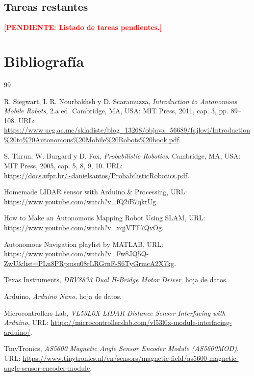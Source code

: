 \documentclass[12pt,a4paper]{article}
\newcommand{\pendiente}[1]{\textcolor{red}{\textbf{[PENDIENTE: #1]}}}
\begin{document}
\subsection{Tareas restantes}
\pendiente{Listado de tareas pendientes.}

\section{Bibliografía}

\begin{thebibliography}{99}

R. Siegwart, I. R. Nourbakhsh y D. Scaramuzza,
\textit{Introduction to Autonomous Mobile Robots}, 2.a ed.
Cambridge, MA, USA: MIT Press, 2011, cap. 3, pp. 89--108.
URL: \url{https://www.ucg.ac.me/skladiste/blog_13268/objava_56689/fajlovi/Introduction%20to%20Autonomous%20Mobile%20Robots%20book.pdf}.

S. Thrun, W. Burgard y D. Fox,
\textit{Probabilistic Robotics}.
Cambridge, MA, USA: MIT Press, 2005, cap. 5, 8, 9, 10.
URL: \url{https://docs.ufpr.br/~danielsantos/ProbabilisticRobotics.pdf}.

Homemade LIDAR sensor with Arduino \& Processing,
URL: \url{https://www.youtube.com/watch?v=fQ2iB7qkrUg}.

How to Make an Autonomous Mapping Robot Using SLAM,
URL: \url{https://www.youtube.com/watch?v=xqjVTE7QvOg}.

Autonomous Navigation playlist by MATLAB,
URL: \url{https://www.youtube.com/watch?v=Fw8JQ5Q-ZwU&list=PLn8PRpmsu08rLRGrnF-S6TyGrmcA2X7kg}.

Texas Instruments, \textit{DRV8833 Dual H-Bridge Motor Driver}, hoja de datos.

Arduino, \textit{Arduino Nano}, hoja de datos.

Microcontrollers Lab, \textit{VL53L0X LIDAR Distance Sensor Interfacing with Arduino}, URL: \url{https://microcontrollerslab.com/vl53l0x-module-interfacing-arduino/}.

TinyTronics, \textit{AS5600 Magnetic Angle Sensor Encoder Module (AS5600MOD)}, URL: \url{https://www.tinytronics.nl/en/sensors/magnetic-field/as5600-magnetic-angle-sensor-encoder-module}.


\end{thebibliography}
\end{document}
